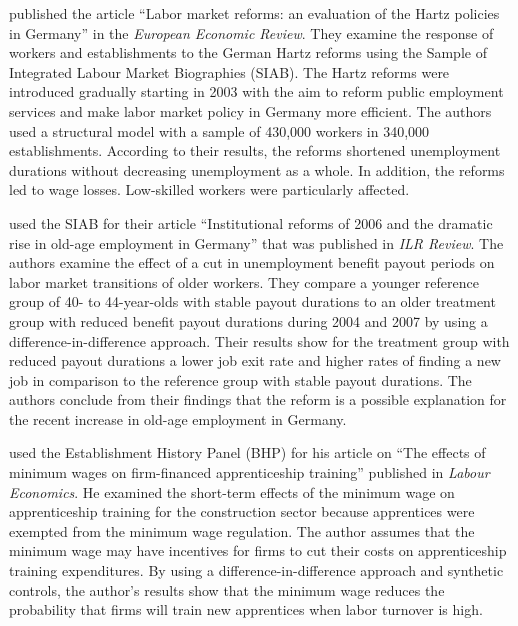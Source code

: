\citet{bradley2019} published the article ``Labor market reforms: an evaluation of the Hartz policies in Germany'' in the \emph{European Economic Review}. They examine the response of workers and establishments to the German Hartz reforms using the Sample of Integrated Labour Market Biographies (SIAB). The Hartz reforms were introduced gradually starting in 2003 with the aim to reform public employment services and make labor market policy in Germany more efficient. The authors used a structural model with a sample of 430,000 workers in 340,000 establishments. According to their results, the reforms shortened unemployment durations without decreasing unemployment as a whole. In addition, the reforms led to wage losses. Low-skilled workers were particularly affected.

\citet{riphahn2019} used the SIAB for their article ``Institutional reforms of 2006 and the dramatic rise in old-age employment in Germany'' that was published in \emph{ILR Review}. The authors examine the effect of a cut in unemployment benefit payout periods on labor market transitions of older workers. They compare a younger reference group of 40- to 44-year-olds with stable payout durations to an older treatment group with reduced benefit payout durations during 2004 and 2007 by using a difference-in-difference approach. Their results show for the treatment group with reduced payout durations a lower job exit rate and higher rates of finding a new job in comparison to the reference group with stable payout durations. The authors conclude from their findings that the reform is a possible explanation for the recent increase in old-age employment in Germany.

\citet{schumann2017} used the Establishment History Panel (BHP) for his article on ``The effects of minimum wages on firm-financed apprenticeship training'' published in \emph{Labour Economics}. He examined the short-term effects of the minimum wage on apprenticeship training for the construction sector because apprentices were exempted from the minimum wage regulation. The author assumes that the minimum wage may have incentives for firms to cut their costs on apprenticeship training expenditures. By using a difference-in-difference approach and synthetic controls, the author's results show that the minimum wage reduces the probability that firms will train new apprentices when labor turnover is high.

